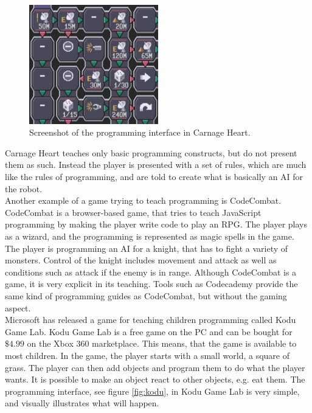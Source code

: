 \begin{figure}[h]
  \centering
    \includegraphics[width=0.5\textwidth]{img/CarnageHeartSoftware.png}
  \caption{Screenshot of the programming interface in Carnage Heart.\cite{carnageheartsoftware}}
  \label{fig:carnageheartsoftware}
\end{figure}

Carnage Heart teaches only basic programming constructs, but do not present them as such. Instead the player is presented with a set of rules, which are much like the rules of programming, and are told to create what is basically an AI for the robot.\\

Another example of a game trying to teach programming is CodeCombat. \cite{codecombat} CodeCombat is a browser-based game, that tries to teach JavaScript programming by making the player write code to play an RPG. The player plays as a wizard, and the programming is represented as magic spells in the game. The player is programming an AI for a knight, that has to fight a variety of monsters. Control of the knight includes movement and attack as well as conditions such as attack if the enemy is in range.
Although CodeCombat is a game, it is very explicit in its teaching. Tools such as Codecademy provide the same kind of programming guides as CodeCombat, but without the gaming aspect.\cite{codecademy}\\

Microsoft has released a game for teaching children programming called Kodu Game Lab. \cite{kodu} Kodu Game Lab is a free game on the PC and can be bought for $\$4.99$ on the Xbox 360 marketplace. This means, that the game is available to most children. In the game, the player starts with a small world, a square of grass. The player can then add objects and program them to do what the player wants. It is possible to make an object react to other objects, e.g. eat them. The programming interface, see figure \autoref{fig:kodu}, in Kodu Game Lab is very simple, and visually illustrates what will happen. 

